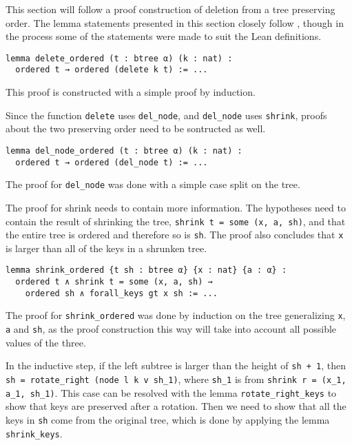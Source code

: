 This section will follow a proof construction of deletion from a tree preserving order. The lemma statements presented in this section closely follow \cite{textbook:discrete_computer}, though in the process some of the statements were made to suit the Lean definitions. 

\begin{lstlisting}
lemma delete_ordered (t : btree α) (k : nat) :
  ordered t → ordered (delete k t) := ...
\end{lstlisting}

This proof is constructed with a simple proof by induction. 

Since the function \lstinline{delete} uses \lstinline{del_node}, and \lstinline{del_node} uses \lstinline{shrink}, proofs about the two preserving order need to be sontructed as well.

\begin{lstlisting}
lemma del_node_ordered (t : btree α) (k : nat) :
  ordered t → ordered (del_node t) := ...
\end{lstlisting}

The proof for \lstinline{del_node} was done with a simple case split on the tree.

The proof for shrink needs to contain more information. The hypotheses need to contain the result of shrinking the tree, \lstinline{shrink t = some (x, a, sh)}, and that the entire tree is ordered and therefore so is \lstinline{sh}. The proof also concludes that \lstinline{x} is larger than all of the keys in a shrunken tree.

\begin{lstlisting}
lemma shrink_ordered {t sh : btree α} {x : nat} {a : α} :
  ordered t ∧ shrink t = some (x, a, sh) →
    ordered sh ∧ forall_keys gt x sh := ...
\end{lstlisting}

The proof for \lstinline{shrink_ordered} was done by induction on the tree generalizing \lstinline{x}, \lstinline{a} and \lstinline{sh}, as the proof construction this way will take into account all possible values of the three.

In the inductive step, if the left subtree is larger than the height of \lstinline{sh + 1}, then \lstinline{sh = rotate_right (node l k v sh_1)}, where \lstinline{sh_1} is from \lstinline{shrink r = (x_1, a_1, sh_1)}. This case can be resolved with the lemma \lstinline{rotate_right_keys} to show that keys are preserved after a rotation. Then we need to show that all the keys in \lstinline{sh} come from the original tree, which is done by applying the lemma \lstinline{shrink_keys}.

